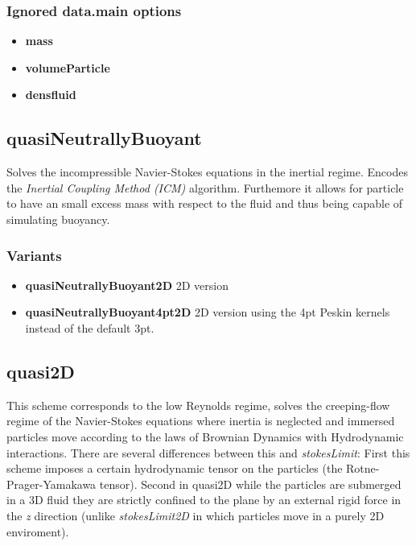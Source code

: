 \documentclass[a4paper,11pt]{refart}
\begin{document}
\subsubsection{Ignored data.main options}

\begin{itemize}
\item \textbf{mass}
\item \textbf{volumeParticle}
\item \textbf{densfluid} 
\end{itemize}

\subsection{quasiNeutrallyBuoyant}

Solves the incompressible Navier-Stokes equations in the inertial regime. Encodes the \emph{Inertial Coupling Method (ICM)} algorithm\cite{ICM,Staggered,IBM}. Furthemore it allows for particle to have an small excess mass with respect to the fluid and thus being capable of simulating buoyancy.

\subsubsection{Variants}
\begin{itemize}
\item \textbf{quasiNeutrallyBuoyant2D} 2D version
\item \textbf{quasiNeutrallyBuoyant4pt2D} 2D version using the 4pt Peskin kernels instead of the default 3pt.
\end{itemize}

\subsection{quasi2D}

This scheme corresponds to the low Reynolds regime, solves the creeping-flow regime of the Navier-Stokes equations where inertia is neglected and immersed particles move according to the laws of Brownian Dynamics with Hydrodynamic interactions. There are several differences between this and \emph{stokesLimit}: First this scheme imposes a certain hydrodynamic tensor on the particles (the Rotne-Prager-Yamakawa tensor). Second in quasi2D while the particles are submerged in a 3D fluid they are strictly confined to the plane by an external rigid force in the \emph{z} direction (unlike \emph{stokesLimit2D} in which particles move in a purely 2D enviroment).
\end{document}
